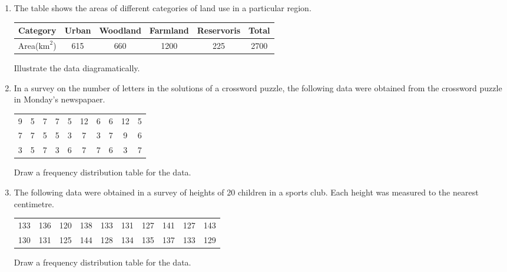\begin{enumerate}  %
	\item  The table shows the areas of different categories of land use in a particular region.
	\medskip
	
	\renewcommand{\arraystretch}{1.2} %
	\begin{tabular}{|c|c|c|c|c|c|}
		\hline
		Category &  Urban & Woodland & Farmland & Reservoris & Total \\ 
		\hline
		Area($\si{\km\squared}$) & 615 & 660 & 1200 & 225 & 2700 \\ 
		\hline
	\end{tabular}

\smallskip

Illustrate the data diagramatically.

\item  In a survey on the number of letters in the solutions of a crossword puzzle, the following data were obtained from the crossword puzzle in Monday's newspapaer.

\begin{tabular}{cccccccccc}
	\rule[-1ex]{0pt}{2.5ex} 9 & 5 & 7 & 7 & 5 & 12 & 6 & 6 & 12 & 5 \\
	\rule[-1ex]{0pt}{2.5ex} 7 & 7 & 5 & 5 & 3 & 7 & 3 & 7 & 9 & 6 \\
	\rule[-1ex]{0pt}{2.5ex} 3 & 5 & 7 & 3 & 6 & 7 & 7 & 6 & 3 & 7 \\
\end{tabular}

Draw a frequency distribution table for the data.



\item  The following data were obtained in a survey of heights of 20 children in a sports club. Each height was measured to the nearest centimetre.

\begin{tabular}{cccccccccc}
	\rule[-1ex]{0pt}{2.5ex} 133 & 136 & 120 & 138 & 133 & 131 & 127 & 141 & 127 & 143 \\
	\rule[-1ex]{0pt}{2.5ex} 130 & 131 & 125 & 144 & 128 & 134 & 135 & 137 & 133 & 129 \\
\end{tabular}

Draw a frequency distribution table for the data.
\end{enumerate}


\newpage


